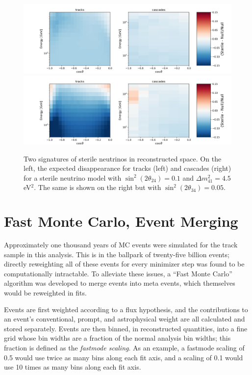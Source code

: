 \documentclass[main.tex]{subfiles}
\begin{document}
\begin{figure}
    \centering
    \includegraphics[width=0.45\linewidth]{figures/meows_bf_nofit.png}%
    \includegraphics[width=0.45\linewidth]{figures/with_th34_nofit.png}
    \caption{Two signatures of sterile neutrinos in reconstructed space. On the left, the expected disappearance for tracks (left) and cascades (right) for a sterile neutrino model with $\sin^{2}(2\theta_{24})=0.1$ and $\Delta m_{41}^{2}=4.5$ eV$^{2}$. The same is shown on the right but with $\sin^{2}(2\theta_{34})=0.05$.}\label{fig:sterile_signature}
\end{figure}

\section{Fast Monte Carlo, Event Merging}

Approximately one thousand years of MC events were simulated for the track sample in this analysis.
This is in the ballpark of twenty-five billion events; directly reweighting all of these events for every minimizer step was found to be computationally intractable. 
To alleviate these issues, a ``Fast Monte Carlo'' algorithm was developed to merge events into meta events, which themselves would be reweighted in fits. 

Events are first weighted according to a flux hypothesis, and the contributions to an event's conventional, prompt, and astrophysical weight are all calculated and stored separately. 
Events are then binned, in reconstructed quantities, into a fine grid whose bin widths are a fraction of the normal analysis bin widths; this fraction is defined as the \textit{fastmode scaling}.
As an example, a fastmode scaling of 0.5 would use twice as many bins along each fit axis, and a scaling of 0.1 would use 10 times as many bins along each fit axis. 
\end{document}
